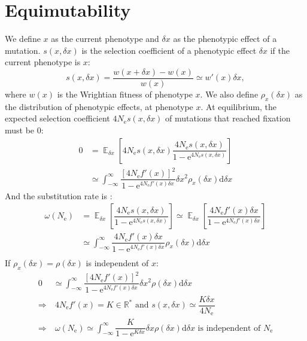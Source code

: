 \documentclass{article}
\DeclareMathOperator{\E}{\mathbb{E}}
\newcommand{\der}{\mathrm{d}}
\newcommand{\e}{\mathrm{e}}
\newcommand{\Ne}{N_{\mathrm{e}}}
\newcommand{\s}{s}
\newcommand{\pheno}{x}
\newcommand{\dpheno}{\delta \pheno}
\begin{document}
\section*{Equimutability}
We define $\pheno$ as the current phenotype and $\dpheno$ as the phenotypic effect of a mutation.
$\s \left( \pheno, \dpheno \right)$ is the selection coefficient of a phenotypic effect $\dpheno$ if the current phenotype is $\pheno$:
\begin{equation*}
\s \left( \pheno, \dpheno \right) = \dfrac{w \left( \pheno + \dpheno \right) - w \left( \pheno \right)}{w \left( \pheno \right)} \simeq w'\left( \pheno \right) \dpheno, 
\end{equation*}
where $w \left( \pheno \right)$ is the Wrightian fitness of phenotype $x$.
We also define $\rho_{\pheno}(\dpheno)$ as the distribution of phenotypic effects, at phenotype $\pheno$.
At equilibrium, the expected selection coefficient $ 4 \Ne \s \left( \pheno, \dpheno \right)$ of mutations that reached fixation must be $0$:
\begin{align*}
0 & = \E_{\dpheno} \left[ 4 \Ne \s\left( \pheno, \dpheno \right) \dfrac{ 4 \Ne \s\left( \pheno, \dpheno \right) }{1 - \e^{4\Ne\s\left( \pheno, \dpheno \right)}} \right] \\ & 
\simeq \int_{-\infty}^{\infty} \dfrac{ \left[ 4 \Ne f'\left( \pheno \right)  \right]^2}{1 - \e^{4\Ne f'\left( \pheno \right) \dpheno} }  \dpheno^2  \rho_{\pheno}(\dpheno) \der \dpheno 
\end{align*}
And the substitution rate is :
\begin{align*}
\omega(\Ne) & = \E_{\dpheno} \left[ \dfrac{ 4 \Ne \s \left( \pheno, \dpheno \right)}{1 - \e^{4\Ne \s \left( \pheno, \dpheno \right)}} \right] \simeq \E_{\dpheno} \left[ \dfrac{ 4 \Ne f'\left( \pheno \right) \dpheno}{1 - \e^{4\Ne f'\left( \pheno \right) \dpheno}} \right] \\
& \simeq \int_{-\infty}^{\infty} \dfrac{4 \Ne f'\left( \pheno \right) \dpheno}{1 - \e^{4\Ne f'\left( \pheno \right) \dpheno } } \rho_{\pheno}(\dpheno) \der \dpheno \\
\end{align*}
If $\rho_{\pheno}(\dpheno) = \rho(\dpheno)$ is independent of $\pheno$:
\begin{align*}
0 & \simeq \int_{-\infty}^{\infty} \dfrac{ \left[ 4 \Ne f'\left( \pheno \right)  \right]^2}{1 - \e^{4\Ne f'\left( \pheno \right) \dpheno} } \dpheno^2 \rho(\dpheno)  \der \dpheno \\
\Longrightarrow & \ 4 \Ne f'\left( \pheno \right) = K \in \mathbb{R}^{*} \text{ and } \s\left( \pheno, \dpheno \right) \simeq \dfrac{K \dpheno}{4\Ne} \\
\Longrightarrow & \ \omega( \Ne ) \simeq \int_{-\infty}^{\infty} \dfrac{ K  }{1 - \e^{K \dpheno } } \dpheno \rho(\dpheno)  \der \dpheno  \text{ is independent of } \Ne
\end{align*}
\end{document}
